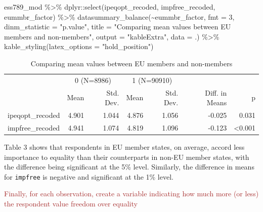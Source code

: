 \documentclass[
]{article}
\newenvironment{Shaded}{\begin{snugshade}}{\end{snugshade}}
\newcommand{\AttributeTok}[1]{\textcolor[rgb]{0.77,0.63,0.00}{#1}}
\newcommand{\DecValTok}[1]{\textcolor[rgb]{0.00,0.00,0.81}{#1}}
\newcommand{\FunctionTok}[1]{\textcolor[rgb]{0.00,0.00,0.00}{#1}}
\newcommand{\NormalTok}[1]{#1}
\newcommand{\SpecialCharTok}[1]{\textcolor[rgb]{0.00,0.00,0.00}{#1}}
\newcommand{\StringTok}[1]{\textcolor[rgb]{0.31,0.60,0.02}{#1}}
\begin{document}
\begin{Shaded}
\begin{Highlighting}[]
\NormalTok{ess789\_mod }\SpecialCharTok{\%\textgreater{}\%}
\NormalTok{  dplyr}\SpecialCharTok{::}\FunctionTok{select}\NormalTok{(ipeqopt\_recoded, impfree\_recoded, eummbr\_factor) }\SpecialCharTok{\%\textgreater{}\%}
  \FunctionTok{datasummary\_balance}\NormalTok{(}\SpecialCharTok{\textasciitilde{}}\NormalTok{eummbr\_factor, }\AttributeTok{fmt =} \DecValTok{3}\NormalTok{,}
                      \AttributeTok{dinm\_statistic =} \StringTok{"p.value"}\NormalTok{, }
                      \AttributeTok{title =} \StringTok{"Comparing mean values between EU members and non{-}members"}\NormalTok{,}
                      \AttributeTok{output =} \StringTok{"kableExtra"}\NormalTok{, }
                      \AttributeTok{data =}\NormalTok{ .) }\SpecialCharTok{\%\textgreater{}\%}
  \FunctionTok{kable\_styling}\NormalTok{(}\AttributeTok{latex\_options =} \StringTok{"hold\_position"}\NormalTok{)}
\end{Highlighting}
\end{Shaded}

\begin{table}[!h]

\caption{\label{tab:mean-equal-free-eu}Comparing mean values between EU members and non-members}
\centering
\begin{tabular}[t]{lrrrrrr}
\toprule
\multicolumn{1}{c}{ } & \multicolumn{2}{c}{0 (N=8986)} & \multicolumn{2}{c}{1 (N=90910)} & \multicolumn{2}{c}{ } \\
\cmidrule(l{3pt}r{3pt}){2-3} \cmidrule(l{3pt}r{3pt}){4-5}
  & Mean & Std. Dev. & Mean & Std. Dev. & Diff. in Means & p\\
\midrule
ipeqopt\_recoded & 4.901 & 1.044 & 4.876 & 1.056 & -0.025 & 0.031\\
impfree\_recoded & 4.941 & 1.074 & 4.819 & 1.096 & -0.123 & <0.001\\
\bottomrule
\end{tabular}
\end{table}

Table 3 shows that respondents in EU member states, on average, accord
less importance to equality than their counterparts in non-EU member
states, with the difference being significant at the 5\% level.
Similarly, the difference in means for \texttt{impfree} is negative and
significant at the 1\% level.

\textcolor{brown}{Finally, for each observation, create a variable indicating how much more (or less) the respondent value freedom over equality}
\end{document}
